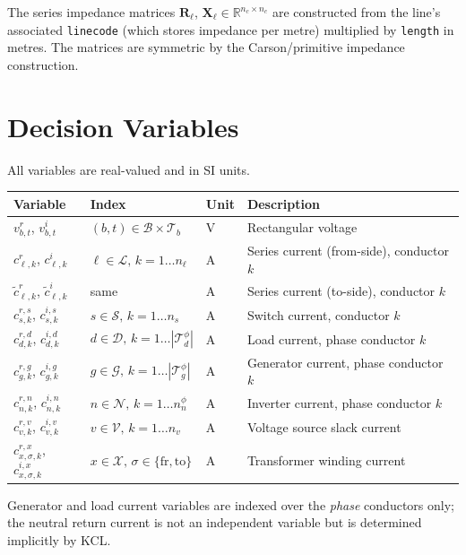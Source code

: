 \documentclass[11pt,a4paper]{article}
\newcommand{\R}{\mathbb{R}}
\newcommand{\mc}[1]{\mathcal{#1}}
\newcommand{\Rmat}{\mathbf{R}}
\newcommand{\Xmat}{\mathbf{X}}
\begin{document}
The series impedance matrices $\Rmat_\ell$, $\Xmat_\ell \in \R^{n_c \times n_c}$
are constructed from the line's associated \texttt{linecode} (which stores
impedance per metre) multiplied by \texttt{length} in metres.  The matrices are
symmetric by the Carson/primitive impedance construction.

\section{Decision Variables}

All variables are real-valued and in SI units.

\begin{center}
\renewcommand{\arraystretch}{1.25}
\begin{tabular}{@{}llll@{}}
\toprule
Variable & Index & Unit & Description \\
\midrule
$v^r_{b,t}$, $v^i_{b,t}$   & $(b,t)\in\mc{B}\times\mc{T}_b$ & V & Rectangular voltage \\
$c^r_{\ell,k}$, $c^i_{\ell,k}$ & $\ell\in\mc{L},\,k=1\ldots n_\ell$ & A & Series current (from-side), conductor $k$ \\
$\tilde{c}^r_{\ell,k}$, $\tilde{c}^i_{\ell,k}$ & same & A & Series current (to-side), conductor $k$ \\
$c^{r,s}_{s,k}$, $c^{i,s}_{s,k}$ & $s\in\mc{S},\,k=1\ldots n_s$ & A & Switch current, conductor $k$ \\
$c^{r,d}_{d,k}$, $c^{i,d}_{d,k}$ & $d\in\mc{D},\,k=1\ldots|\mc{T}_d^\phi|$ & A & Load current, phase conductor $k$ \\
$c^{r,g}_{g,k}$, $c^{i,g}_{g,k}$ & $g\in\mc{G},\,k=1\ldots|\mc{T}_g^\phi|$ & A & Generator current, phase conductor $k$ \\
$c^{r,n}_{n,k}$, $c^{i,n}_{n,k}$ & $n\in\mc{N},\,k=1\ldots n^\phi_n$ & A & Inverter current, phase conductor $k$ \\
$c^{r,v}_{v,k}$, $c^{i,v}_{v,k}$ & $v\in\mc{V},\,k=1\ldots n_v$ & A & Voltage source slack current \\
$c^{r,x}_{x,\sigma,k}$, $c^{i,x}_{x,\sigma,k}$ & $x\in\mc{X},\,\sigma\in\{\text{fr},\text{to}\}$ & A & Transformer winding current \\
\bottomrule
\end{tabular}
\end{center}

Generator and load current variables are indexed over the \emph{phase}
conductors only; the neutral return current is not an independent variable but
is determined implicitly by KCL.
\end{document}
